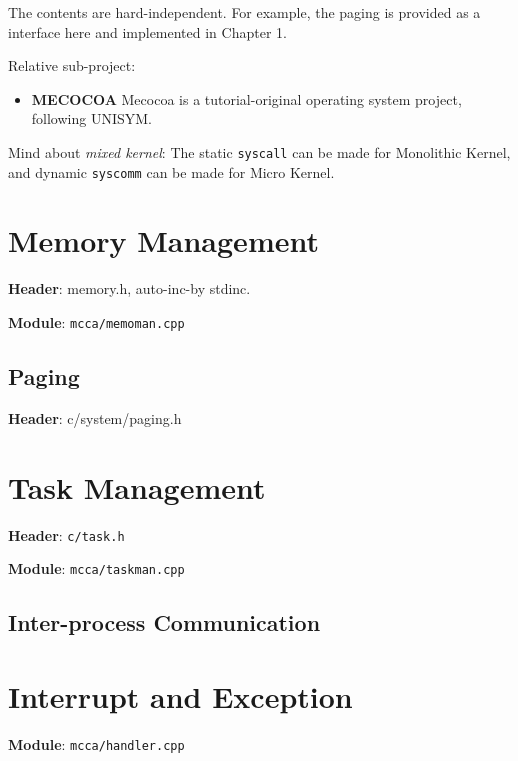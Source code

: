 The contents are hard-independent. For example, the paging is provided as a interface here and implemented in Chapter 1.

Relative sub-project:

\begin{itemize}

\item \textbf{MECOCOA} Mecocoa is a tutorial-original operating system project, following UNISYM.
\end{itemize}

Mind about \textit{mixed kernel}: The static \verb|syscall| can be made for Monolithic Kernel, and dynamic \verb|syscomm| can be made for Micro Kernel.



\chapter{Memory Management}

\textbf{Header}: memory.h, auto-inc-by stdinc.

\textbf{Module}: \verb|mcca/memoman.cpp|



\section{Paging}

\textbf{Header}: c/system/paging.h



\chapter{Task Management}

\textbf{Header}: \verb|c/task.h|

\textbf{Module}: \verb|mcca/taskman.cpp|



\section{Inter-process Communication}



\chapter{Interrupt and Exception}

\textbf{Module}: \verb|mcca/handler.cpp|

